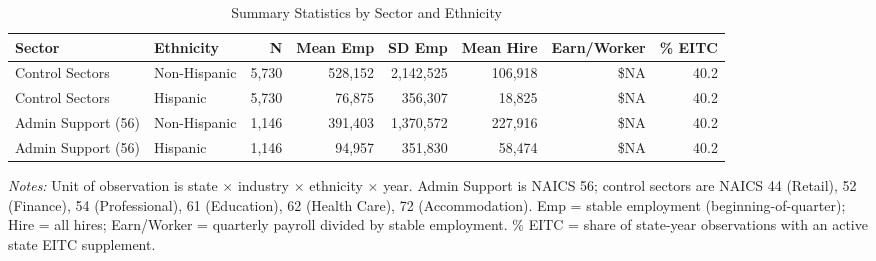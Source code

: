 \begin{table}[htbp]
\centering
\caption{Summary Statistics by Sector and Ethnicity}
\label{tab:summary}
\footnotesize
\begin{adjustbox}{max width=\textwidth}
\begin{tabular}{llrrrrrr}
\hline\hline
Sector & Ethnicity & N & Mean Emp & SD Emp & Mean Hire & Earn/Worker & \% EITC \\
\hline
Control Sectors & Non-Hispanic & 5,730 & 528,152 & 2,142,525 & 106,918 & \$NA & 40.2 \\
Control Sectors & Hispanic & 5,730 & 76,875 & 356,307 & 18,825 & \$NA & 40.2 \\
Admin Support (56) & Non-Hispanic & 1,146 & 391,403 & 1,370,572 & 227,916 & \$NA & 40.2 \\
Admin Support (56) & Hispanic & 1,146 & 94,957 & 351,830 & 58,474 & \$NA & 40.2 \\
\hline\hline
\end{tabular}
\end{adjustbox}
\begin{tablenotes}[flushleft]
\small
\item \textit{Notes:} Unit of observation is state $\times$ industry $\times$ ethnicity $\times$ year. Admin Support is NAICS 56; control sectors are NAICS 44 (Retail), 52 (Finance), 54 (Professional), 61 (Education), 62 (Health Care), 72 (Accommodation). Emp = stable employment (beginning-of-quarter); Hire = all hires; Earn/Worker = quarterly payroll divided by stable employment. \% EITC = share of state-year observations with an active state EITC supplement.
\end{tablenotes}
\end{table}
